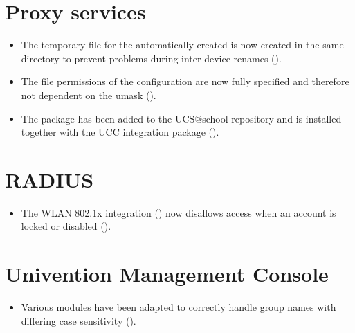 \section{Proxy services}
\begin{itemize}
\item The temporary file for the automatically created  is now created in the same directory to prevent problems during inter-device renames ().
\item The file permissions of the  configuration are now fully specified and therefore not dependent on the umask ().
\item The package  has been added to the
UCS@school repository and is installed together with the UCC integration
package  ().
\end{itemize}

\section{RADIUS}
\begin{itemize}
\item The WLAN 802.1x integration () now disallows access when an account is locked or disabled ().
\end{itemize}

%

\section{Univention Management Console}
\begin{itemize}
\item Various  modules have been adapted to correctly handle group names with differing case sensitivity ().
\end{itemize}


